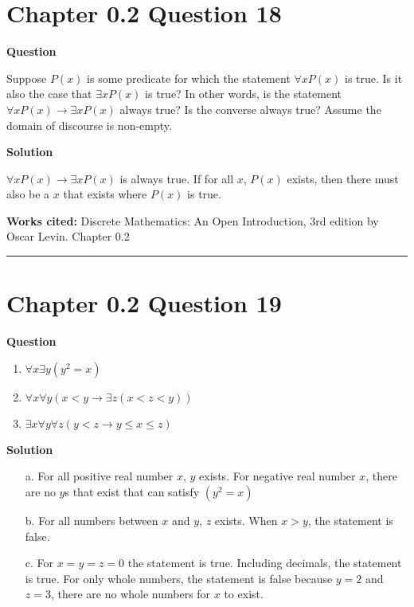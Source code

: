 \documentclass{article}
\begin{document}
\section*{Chapter 0.2 Question 18} 

\textbf{Question}

Suppose $P(x)$ is some predicate for which the statement $\forall xP(x)$ is true. Is it also the case that $\exists xP(x)$ is true? In other words, is the statement $\forall x P(x) \to \exists x P(x)$ always true? Is the converse always true? Assume the domain of discourse is non-empty.

\textbf{Solution}

$\forall x P(x) \to \exists x P(x)$ is always true. If for all $x$, $P(x)$ exists, then there must also be a $x$ that exists where $P(x)$ is true.


\vspace{0.5cm}
\textbf{Works cited:}
Discrete Mathematics: An Open Introduction, 3rd edition by Oscar Levin. Chapter 0.2


\vspace{0.5cm}
\hrule
\vspace{0.5cm}

\section*{Chapter 0.2 Question 19} 

\textbf{Question}

\begin{enumerate}[label=\alph*.]
    \item $\forall x \exists y (y^2 = x)$
    \item $\forall x \forall y (x < y \to \exists z (x < z < y))$
    \item $\exists x \forall y \forall z (y < z \to y \leq x \leq z)$
\end{enumerate}

\textbf{Solution}

\begin{enumerate}
    \item[a.] For all positive real number $x$, $y$ exists. For negative real number $x$, there are no $y$s that exist that can satisfy $(y^{2} = x)$
    \item[b.] For all numbers between $x$ and $y$, $z$ exists. When $x>y$, the statement is false.
    \item[c.]  For $x=y=z=0$ the statement is true. Including decimals, the statement is true. For only whole numbers, the statement is false because $y=2$ and $z=3$, there are no whole numbers for $x$ to exist.
\end{enumerate}
\end{document}
